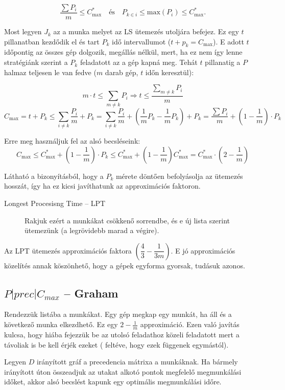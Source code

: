 \[ \frac{\sum P_i}{m} \leq C^*_{\mbox{max}} ~~~\mbox{ és }~~~
   P_{k \in i} \leq \mbox{max} (P_i) \leq C^*_{\mbox{max}}. 
\]

Most legyen $J_k$ az a munka melyet az LS ütemezés utoljára befejez. Ez egy $t$
pillanatban kezdődik el és tart $P_k$ idő intervallumot ($t+p_k=C_{\mbox{max}}$).
E adott $t$ időpontig az összes gép dolgozik, megállás nélkül, mert, ha ez nem
így lenne stratégiánk szerint a $P_k$ feladatott az a gép kapná meg. Tehát $t$
pillanatig a $P$ halmaz teljesen le van fedve ($m$ darab gép, $t$ időn
keresztül):

\[ m \cdot t \leq \sum_{m \neq k}P_i \Rightarrow t \leq \frac{\sum\limits_{m \neq k}P_i}{m} 
\]
\[ C_{\mbox{max}}=t+P_k \leq \sum_{i \neq  k} \frac{P_i}{m} + P_k = \sum_{i \neq
 k} \frac{P_i}{m} + \left(\frac{1}{m} P_k - \frac{1}{m} P_k\right) + P_k 
 = \frac{\sum P_i}{m} + \left(1-\frac{1}{m}\right) \cdot P_k
\]

Erre meg használjuk fel az alsó becsléseink:
\[
C_{\mbox{max}} \leq C^*_{\mbox{max}} + \left(1-\frac{1}{m}\right) \cdot P_k 
\leq C^*_{\mbox{max}} + \left(1-\frac{1}{m}\right) C^*_{\mbox{max}} 
=C^*_{\mbox{max}} \cdot \left(2-\frac{1}{m}\right)
\]

Látható a bizonyításból, hogy a $P_k$ mérete döntően befolyásolja az ütemezés
hosszát, így ha ez kicsi javíthatunk az approximációs faktoron. 
\begin{description}
  \item[Longest Procesisng Time -- LPT ] Rakjuk ezért a munkákat csökkenő
  sorrendbe, és e új lista szerint ütemezünk (a legrövidebb marad a végire).
\end{description}
 
Az LPT ütemezés approximációs faktora $\left( \dfrac{4}{3} - \dfrac{1}{3m}
\right)$. E jó approximációs közelítés annak köszönhető, hogy a gépek egyforma
gyorsak, tudásuk azonos.

\subsection{ \texorpdfstring {$ P|prec|C_{max} $} {P|prec|Cmax} -- Graham}

Rendezzük listába a munkákat. Egy gép megkap egy munkát, ha áll és a következő
munka elkezdhető. Ez egy $2-\frac{1}{m}$ approximáció. Ezen való javítás kulcsa,
hogy hiába fejezzük be az utolsó feladathoz közeli feladatott mert a távoliak is
be kell érjék ezeket ( feltéve, hogy ezek függenek egymástól). 

Legyen $D$ irányított gráf a precedencia mátrixa a munkáknak. Ha bármely
irányított úton összeadjuk az utakat alkotó pontok megfelelő megmunkálási
időket, akkor alsó becslést kapunk egy optimális megmunkálási időre.

